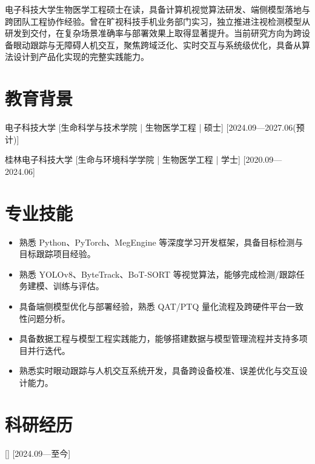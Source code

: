 \documentclass{resume-photo}
\begin{document}

\ResumeTitle


\noindent 电子科技大学生物医学工程硕士在读，具备计算机视觉算法研发、端侧模型落地与跨团队工程协作经验。曾在旷视科技手机业务部门实习，独立推进注视检测模型从研发到交付，在复杂场景准确率与部署效果上取得显著提升。当前研究方向为跨设备眼动跟踪与无障碍人机交互，聚焦跨域泛化、实时交互与系统级优化，具备从算法设计到产品化实现的完整实践能力。


\section{教育背景}
\ResumeItem
{电子科技大学}
[\textnormal{生命科学与技术学院 | 生物医学工程 | 硕士}]
[2024.09—2027.06(预计)]

\ResumeItem
{桂林电子科技大学}
[\textnormal{生命与环境科学学院 | 生物医学工程 | 学士}]
[2020.09—2024.06]

\section{专业技能}
\begin{itemize}
  \item 熟悉 Python、PyTorch、MegEngine 等深度学习开发框架，具备目标检测与目标跟踪项目经验。
  \item 熟悉 YOLOv8、ByteTrack、BoT-SORT 等视觉算法，能够完成检测/跟踪任务建模、训练与评估。
  \item 具备端侧模型优化与部署经验，熟悉 QAT/PTQ 量化流程及跨硬件平台一致性问题分析。
  \item 具备数据工程与模型工程实践能力，能够搭建数据与模型管理流程并支持多项目并行迭代。
  \item 熟悉实时眼动跟踪与人机交互系统开发，具备跨设备校准、误差优化与交互设计能力。
\end{itemize}

\section{科研经历}

[]
[2024.09—至今]
\end{document}
